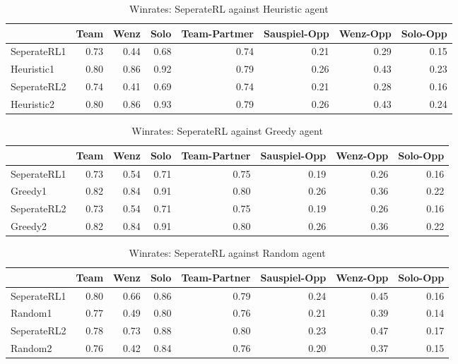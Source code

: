 \begin{table}
    \begin{tabular}{lrrrrrrr}
        \toprule
        {}          & Team & Wenz & Solo & Team-Partmer & Sauspiel-Opp & Wenz-Opp & Solo-Opp \\
        \midrule
        SeperateRL1 & 0.73 & 0.44 & 0.68 & 0.74         & 0.21         & 0.29     & 0.15     \\
        Heuristic1  & 0.80 & 0.86 & 0.92 & 0.79         & 0.26         & 0.43     & 0.23     \\
        SeperateRL2 & 0.74 & 0.41 & 0.69 & 0.74         & 0.21         & 0.28     & 0.16     \\
        Heuristic2  & 0.80 & 0.86 & 0.93 & 0.79         & 0.26         & 0.43     & 0.24     \\
        \bottomrule
    \end{tabular}

    \caption{Winrates: SeperateRL against Heuristic agent}
    \label{tab:heusep}
\end{table}

\begin{table}
    \begin{tabular}{lrrrrrrr}
        \toprule
        {}          & Team & Wenz & Solo & Team-Partner & Sauspiel-Opp & Wenz-Opp & Solo-Opp \\
        \midrule
        SeperateRL1 & 0.73 & 0.54 & 0.71 & 0.75         & 0.19         & 0.26     & 0.16     \\
        Greedy1     & 0.82 & 0.84 & 0.91 & 0.80         & 0.26         & 0.36     & 0.22     \\
        SeperateRL2 & 0.73 & 0.54 & 0.71 & 0.75         & 0.19         & 0.26     & 0.16     \\
        Greedy2     & 0.82 & 0.84 & 0.91 & 0.80         & 0.26         & 0.36     & 0.22     \\
        \bottomrule
    \end{tabular}
    \caption{Winrates: SeperateRL against Greedy agent}
    \label{tab:greedysep}
\end{table}

\begin{table}
    \begin{tabular}{lrrrrrrr}
        \toprule
        {}          & Team & Wenz & Solo & Team-Partner & Sauspiel-Opp & Wenz-Opp & Solo-Opp \\
        \midrule
        SeperateRL1 & 0.80 & 0.66 & 0.86 & 0.79         & 0.24         & 0.45     & 0.16     \\
        Random1     & 0.77 & 0.49 & 0.80 & 0.76         & 0.21         & 0.39     & 0.14     \\
        SeperateRL2 & 0.78 & 0.73 & 0.88 & 0.80         & 0.23         & 0.47     & 0.17     \\
        Random2     & 0.76 & 0.42 & 0.84 & 0.76         & 0.20         & 0.37     & 0.15     \\
        \bottomrule
    \end{tabular}
    \caption{Winrates: SeperateRL against Random agent}
    \label{tab:ransep}
\end{table}

